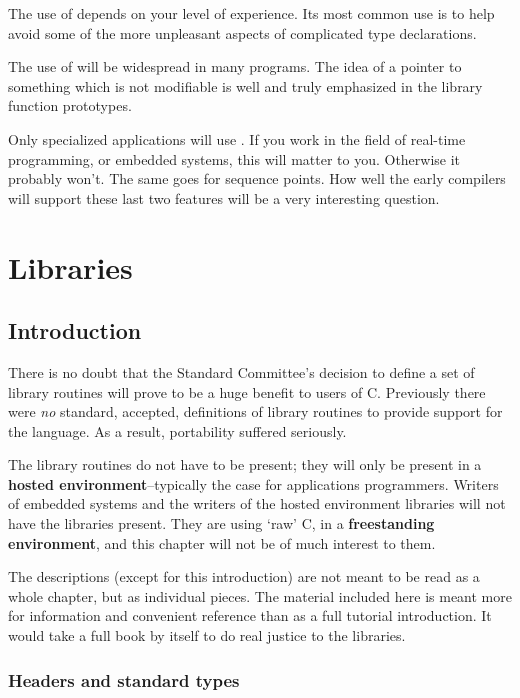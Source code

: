   The use of \typedef{} depends on your level of experience.
   Its most common use is to help avoid some of the more unpleasant aspects
   of complicated type declarations.


  The use of \const{} will be widespread in many programs.
   The idea of a pointer to something which is not modifiable is well and
   truly emphasized in the library function prototypes.


  Only specialized applications will use \volatile. If you
   work in the field of real-time programming, or embedded systems, this
   will matter to you. Otherwise it probably won't. The same goes for
   sequence points. How well the early compilers will support these last
   two features will be a very interesting question.


 \chapter{Libraries}


        \section{Introduction}
        

  

  There is no doubt that the Standard Committee's decision to
   define a set of library routines will prove to be a huge
   benefit to users of C.  Previously there were \textit{no} standard,
   accepted, definitions of library routines to provide support
   for the language.  As a result, portability suffered
   seriously.


  The library routines do not have to be present; they will
   only be present in a \textbf{hosted environment}--typically the case
   for applications programmers.  Writers of embedded systems
   and the writers of the hosted environment libraries will not
   have the libraries present.  They are using `raw' C, in a
   \textbf{freestanding environment}, and this chapter will not be of
   much interest to them.


  The descriptions (except for this introduction) are not
   meant to be read as a whole chapter, but as individual
   pieces.  The material included here is meant more for
   information and convenient reference than as a full tutorial
   introduction.  It would take a full book by itself to do
   real justice to the libraries.


  \subsection{Headers and standard types}
   

